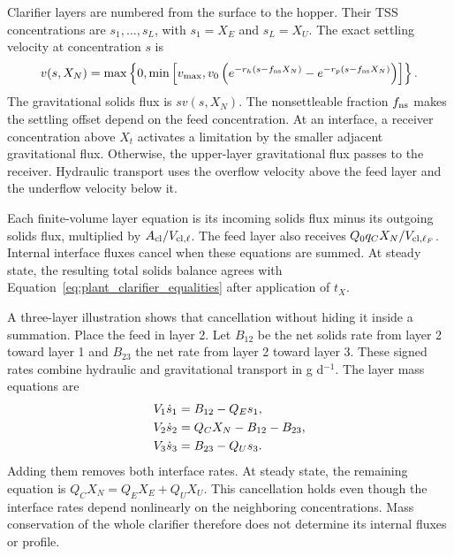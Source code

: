 Clarifier layers are numbered from the surface to the hopper. Their TSS concentrations are $s_1,\ldots,s_L$, with $s_1=X_E$ and $s_L=X_U$. The exact settling velocity at concentration $s$ is
\begin{equation}
\equationname{Bounded double-exponential settling velocity}
v(s,X_N)=\max\left\{0,\min\left[v_{\max},
v_0\left(e^{-r_h(s-f_{\rm ns}X_N)}-e^{-r_p(s-f_{\rm ns}X_N)}\right)\right]\right\}.
\label{eq:plant_settling_velocity}
\end{equation}
The gravitational solids flux is $sv(s,X_N)$. The nonsettleable fraction $f_{\rm ns}$ makes the settling offset depend on the feed concentration. At an interface, a receiver concentration above $X_t$ activates a limitation by the smaller adjacent gravitational flux. Otherwise, the upper-layer gravitational flux passes to the receiver. Hydraulic transport uses the overflow velocity above the feed layer and the underflow velocity below it.

Each finite-volume layer equation is its incoming solids flux minus its outgoing solids flux, multiplied by $A_{\rm cl}/V_{{\rm cl},\ell}$. The feed layer also receives $Q_0q_CX_N/V_{{\rm cl},\ell_F}$. Internal interface fluxes cancel when these equations are summed. At steady state, the resulting total solids balance agrees with Equation~\eqref{eq:plant_clarifier_equalities} after application of $t_X$.

A three-layer illustration shows that cancellation without hiding it inside a summation. Place the feed in layer 2. Let $B_{12}$ be the net solids rate from layer 2 toward layer 1 and $B_{23}$ the net rate from layer 2 toward layer 3. These signed rates combine hydraulic and gravitational transport in g d$^{-1}$. The layer mass equations are
\begin{align}
\equationname{Illustrative solids equation for the upper clarifier layer}
V_1\dot s_1&=B_{12}-Q_Es_1,\\
\equationname{Illustrative solids equation for the clarifier feed layer}
V_2\dot s_2&=Q_CX_N-B_{12}-B_{23},\\
\equationname{Illustrative solids equation for the lower clarifier layer}
V_3\dot s_3&=B_{23}-Q_Us_3.
\end{align}
Adding them removes both interface rates. At steady state, the remaining equation is $Q_CX_N=Q_EX_E+Q_UX_U$. This cancellation holds even though the interface rates depend nonlinearly on the neighboring concentrations. Mass conservation of the whole clarifier therefore does not determine its internal fluxes or profile.

